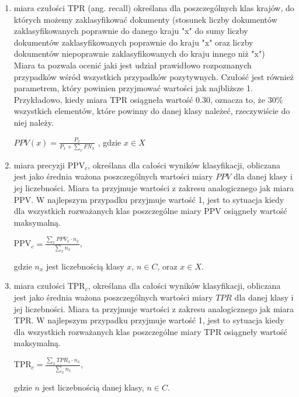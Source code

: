 \documentclass{classrep}
\begin{document}
\begin{enumerate}
\item miara czułości TPR (ang. recall) określana dla poszczególnych klas krajów, do których możemy zaklasyfikować dokumenty (stosunek liczby dokumentów zaklasyfikowanych poprawnie do danego kraju "x" do sumy liczby dokumentów zaklasyfikowanych poprawnie do kraju "x" oraz liczby dokumentów niepoprawnie zaklasyfikowanych do kraju innego niż "x")\\
Miara ta pozwala ocenić jaki jest udział prawidłowo rozpoznanych przypadków wśród wszystkich przypadków pozytywnych. Czułość jest również parametrem, który powinien przyjmować wartości jak najbliższe 1.
Przykładowo, kiedy miara TPR osiągneła wartość 0.30, oznacza to, że 30\% wszystkich elementów, które powinny do danej klasy należeć, rzeczywiście do niej należy.\\
\begin{center}
  $PPV(x) = \frac{P_x}{ P_x + \sum_{x}  FN_x}$ , gdzie $x\in X$ \\

\end{center} \hfill \break

\item miara precyzji PPV$_c$, określana dla całości wyników klasyfikacji, obliczana jest jako średnia ważona poszczególnych wartości miary \(PPV\) dla danej klasy i jej liczebności.
Miara ta przyjmuje wartości z zakresu analogicznego jak miara PPV. W najlepszym przypadku przyjmuje wartość 1, jest to sytuacja kiedy dla wszystkich rozważanych klas poszczególne miary PPV osiągneły wartość maksymalną.
\\
\begin{center}
  PPV$_c = \frac{\sum_{x} PPV_x \cdot n_{x}}{\sum_{x} n_{x}}$,\\ 
\end{center}
    gdzie $n_x$ jest liczebnością klasy $x$, $n\in C$, oraz $x\in X$.\\

\item miara czułości TPR$_c$, określana dla całości wyników klasyfikacji, obliczana jest jako średnia ważona poszczególnych wartości miary \(TPR\) dla danej klasy i jej liczebności.
Miara ta przyjmuje wartości z zakresu analogicznego jak miara TPR. W najlepszym przypadku przyjmuje wartość 1, jest to sytuacja kiedy dla wszystkich rozważanych klas poszczególne miary TPR osiągneły wartość maksymalną.
\\
\begin{center}
    TPR$_c = \frac{\sum_{x} TPR_x \cdot n_{x}}{\sum_{x} n_{x}}$, \\
  \end{center}
gdzie $n$ jest liczebnością danej klasy, $n\in C$.\\


\end{enumerate}
\end{document}
